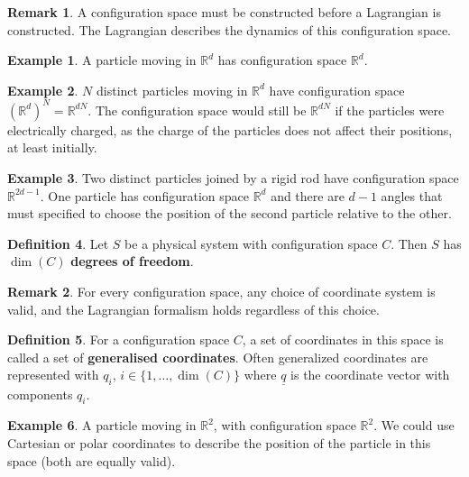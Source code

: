 \documentclass[12pt,a4paper]{article}
\theoremstyle{definition}
\newtheorem{definition}{Definition}[subsection]
\newtheorem{example}[definition]{Example}
\newtheorem*{remark}{Remark}
\begin{document}
\begin{remark}
	A configuration space must be constructed before a Lagrangian is constructed. The Lagrangian describes the dynamics of this configuration space.
\end{remark}

\begin{example}
	A particle moving in $\mathbb{R}^d$ has configuration space $\mathbb{R}^d$.
\end{example}

\begin{example}
	$N$ distinct particles moving in $\mathbb{R}^d$ have configuration space ${(\mathbb{R}^d)}^N = \mathbb{R}^{dN}$. The configuration space would still be $\mathbb{R}^{dN}$ if the particles were electrically charged, as the charge of the particles does not affect their positions, at least initially.
\end{example}

\begin{example}
	Two distinct particles joined by a rigid rod have configuration space $\mathbb{R}^{2d - 1}$. One particle has configuration space $\mathbb{R}^d$ and there are $d - 1$ angles that must specified to choose the position of the second particle relative to the other.
\end{example}

\begin{definition}
	Let $S$ be a physical system with configuration space $C$. Then $S$ has $\dim(C)$ \textbf{degrees of freedom}.
\end{definition}

\begin{remark}
	For every configuration space, any choice of coordinate system is valid, and the Lagrangian formalism holds regardless of this choice.
\end{remark}

\begin{definition}
	For a configuration space $C$, a set of coordinates in this space is called a set of \textbf{generalised coordinates}. Often generalized coordinates are represented with $q_i$, $i \in \{ 1, \dots, \dim(C) \}$ where $\underline{q}$ is the coordinate vector with components $q_i$.
\end{definition}

\begin{example}
	A particle moving in $\mathbb{R}^2$, with configuration space $\mathbb{R}^2$. We could use Cartesian or polar coordinates to describe the position of the particle in this space (both are equally valid).
\end{example}
\end{document}
